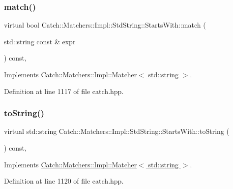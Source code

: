 \subsubsection{\texorpdfstring{match()}{match()}}
{\footnotesize\ttfamily virtual bool Catch\+::\+Matchers\+::\+Impl\+::\+Std\+String\+::\+Starts\+With\+::match (\begin{DoxyParamCaption}\item[{std\+::string const \&}]{expr }\end{DoxyParamCaption}) const\hspace{0.3cm}{\ttfamily [inline]}, {\ttfamily [virtual]}}



Implements \hyperlink{struct_catch_1_1_matchers_1_1_impl_1_1_matcher_a8c1c5511ce1f3738a45e6901b558f583}{Catch\+::\+Matchers\+::\+Impl\+::\+Matcher$<$ std\+::string $>$}.



Definition at line 1117 of file catch.\+hpp.

\hypertarget{struct_catch_1_1_matchers_1_1_impl_1_1_std_string_1_1_starts_with_a85a24e2ac23025edbe31cbf5bb755fb3}{}\label{struct_catch_1_1_matchers_1_1_impl_1_1_std_string_1_1_starts_with_a85a24e2ac23025edbe31cbf5bb755fb3} 
\subsubsection{\texorpdfstring{to\+String()}{toString()}}
{\footnotesize\ttfamily virtual std\+::string Catch\+::\+Matchers\+::\+Impl\+::\+Std\+String\+::\+Starts\+With\+::to\+String (\begin{DoxyParamCaption}{ }\end{DoxyParamCaption}) const\hspace{0.3cm}{\ttfamily [inline]}, {\ttfamily [virtual]}}



Implements \hyperlink{struct_catch_1_1_matchers_1_1_impl_1_1_matcher_a091bcc37e589967d7e10fc7790d820e2}{Catch\+::\+Matchers\+::\+Impl\+::\+Matcher$<$ std\+::string $>$}.



Definition at line 1120 of file catch.\+hpp.




